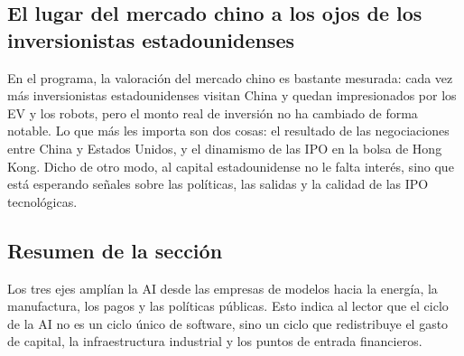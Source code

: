 \subsection{El lugar del mercado chino a los ojos de los inversionistas estadounidenses}

En el programa, la valoración del mercado chino es bastante mesurada: cada vez más inversionistas estadounidenses visitan China y quedan impresionados por los EV y los robots, pero el monto real de inversión no ha cambiado de forma notable. Lo que más les importa son dos cosas: el resultado de las negociaciones entre China y Estados Unidos, y el dinamismo de las IPO en la bolsa de Hong Kong. Dicho de otro modo, al capital estadounidense no le falta interés, sino que está esperando señales sobre las políticas, las salidas y la calidad de las IPO tecnológicas.

\subsection{Resumen de la sección}

Los tres ejes amplían la AI desde las empresas de modelos hacia la energía, la manufactura, los pagos y las políticas públicas. Esto indica al lector que el ciclo de la AI no es un ciclo único de software, sino un ciclo que redistribuye el gasto de capital, la infraestructura industrial y los puntos de entrada financieros.
